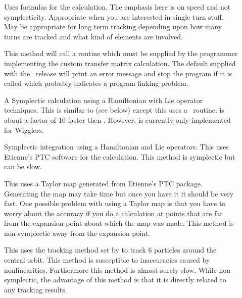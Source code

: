 \begin{description}

\item[]
Uses formulas for the calculation. The emphasis here is on speed and not
symplecticity. Appropriate when you are interested in single turn
stuff. May be appropriate for long term tracking depending upon how
many turns are tracked and what kind of elements are involved. 

\item[]
This method will call a routine  which must be
supplied by the programmer implementing the custom transfer matrix
calculation. The default  supplied with the
\bmad\ release will print an error message and stop the program if it
is called which probably indicates a program linking problem.

\item[]
A Symplectic calculation using a Hamiltonian with Lie operator techniques.
This is similar to  (see below) except this uses a
\bmad\ routine.  is about a factor of 10 faster 
then . However,  is
currently only implemented for Wigglers.

\item[]
Symplectic integration using a Hamiltonian and Lie operators.
This uses Etienne's PTC software for the calculation.
This method is symplectic but can be slow.

\item[]
This uses a Taylor map generated from Etienne's PTC
package. Generating the map may take time but once you have it it
should be very fast. One possible problem with using a Taylor map is
that you have to worry about the accuracy if you do a calculation at points
that are far from the expansion point about which the map was
made. This method is non-symplectic away from the expansion point. 

\item[]
This uses the tracking method set by  to track 6
particles around the central orbit. This method is susceptible to inaccuracies
caused by nonlinearities. Furthermore this method
is almost surely slow. While non--symplectic, the advantage of this method
is that it is directly related to any tracking results.

\end{description}

